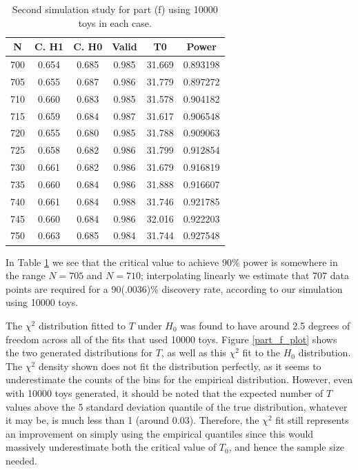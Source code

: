 \documentclass[12pt]{article}
\begin{document}
\begin{table}
    \centering
    \begin{tabular}{| c | c | c | c | c | c |}
        \hline
          N & C. H1   & C. H0    & Valid   & T0       & Power    \\
        \hline
        700 & 0.654   & 0.685    & 0.985   & 31.669   & 0.893198 \\
        \hline
        705 & 0.655   & 0.687    & 0.986   & 31.779   & 0.897272 \\
        \hline
        710 & 0.660   & 0.683    & 0.985   & 31.578   & 0.904182 \\
        \hline
        715 & 0.659   & 0.684    & 0.987   & 31.617   & 0.906548 \\
        \hline
        720 & 0.655   & 0.680    & 0.985   & 31.788   & 0.909063 \\
        \hline
        725 & 0.658   & 0.682    & 0.986   & 31.799   & 0.912854 \\
        \hline
        730 & 0.661   & 0.682    & 0.986   & 31.679   & 0.916819 \\
        \hline
        735 & 0.660   & 0.684    & 0.986   & 31.888   & 0.916607 \\
        \hline
        740 & 0.661   & 0.684    & 0.988   & 31.746   & 0.921785 \\
        \hline
        745 & 0.660   & 0.684    & 0.986   & 32.016   & 0.922203 \\
        \hline
        750 & 0.663   & 0.685    & 0.984   & 31.744   & 0.927548 \\
        \hline
    \end{tabular}
\caption{Second simulation study for part (f) using 10000 toys in each case.}
\label{tab_f_2}
\end{table}

In Table \ref{tab_f_2} we see that the critical value to achieve 90\% power is somewhere in the range $N=705$ and $N=710$; interpolating linearly we estimate that 707 data points are required for a 90(.0036)\% discovery rate, according to our simulation using 10000 toys.

The $\chi^2$ distribution fitted to $T$ under $H_0$ was found to have around 2.5 degrees of freedom across all of the fits that used 10000 toys.
Figure \ref{part_f_plot} shows the two generated distributions for $T$, as well as this $\chi^2$ fit to the $H_0$ distribution.
The $\chi^2$ density shown does not fit the distribution perfectly, as it seems to underestimate the counts of the bins for the empirical distribution.
However, even with 10000 toys generated, it should be noted that the expected number of $T$ values above the 5 standard deviation quantile of the true distribution, whatever it may be, is much less than 1 (around 0.03).
Therefore, the $\chi^2$ fit still represents an improvement on simply using the empirical quantiles since this would massively underestimate both the critical value of $T_0$, and hence the sample size needed.
\end{document}
